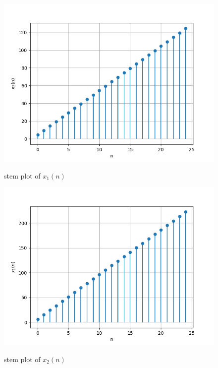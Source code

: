 \documentclass[journal,12pt,onecolumn]{IEEEtran}
\theoremstyle{remark}
\begin{document}
\begin{figure}[h!]
	\centering
	\includegraphics[width=\columnwidth]{figs/fig1.png}
	\label{fig:plot}
	\caption{\large{stem plot of $x_1(n)$}}
\end{figure}
\begin{figure}[h!]
	\centering
	\includegraphics[width=\columnwidth]{figs/fig2.png}
	\label{fig:plot}
	\caption{\large{stem plot of $x_2(n)$}}
\end{figure}
\end{document}
